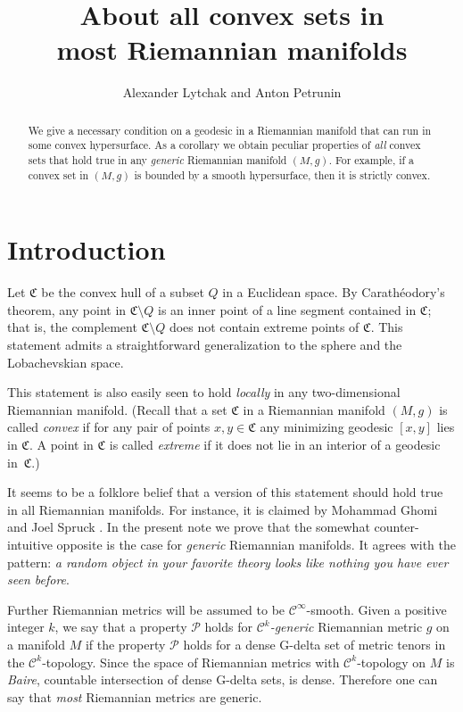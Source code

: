 \documentclass[a4paper,10pt]{article}
\def\thetitle{About all convex sets in\\ most Riemannian manifolds}
\begin{document}
\title{\thetitle}
\author{Alexander Lytchak and Anton Petrunin}
\date{}
\maketitle

\begin{abstract}
We give a necessary condition on a geodesic in a Riemannian manifold that can run in some convex hypersurface.
As a corollary we obtain peculiar properties of \emph{all} convex sets that hold true in any \emph{generic} Riemannian manifold $(M,g)$.
For example, if a convex set in $(M,g)$ is bounded by a smooth hypersurface, then it is strictly convex.
\end{abstract}

\section{Introduction}
Let $\mathfrak{C}$ be the convex hull of a subset $Q$ in a Euclidean space.
By Carathéodory's theorem, any point in $\mathfrak{C}\setminus Q$ is an inner point of a line segment contained in $\mathfrak{C}$;
that is, the complement $\mathfrak{C} \setminus Q$ does not contain extreme points of $\mathfrak{C}$.
This statement admits a straightforward generalization to the sphere and the Lobachevskian space.

This statement is also easily seen to hold \emph{locally} in any two-dimensional Riemannian manifold.
(Recall that a set $\mathfrak{C}$ in a Riemannian manifold $(M,g)$ is called \emph{convex} if for any pair of points $x,y\in \mathfrak{C}$ any minimizing geodesic $[x,y]$ lies in $\mathfrak{C}$.
A point in $\mathfrak{C}$ is called \emph{extreme} if it does not lie in an interior of a geodesic in~$\mathfrak{C}$.)

It seems to be a folklore belief that a version of this statement should hold true in all Riemannian manifolds.
For instance, it is claimed by Mohammad Ghomi and Joel Spruck \cite[Lemma 9.1]{Ghomi}.
In the present note we prove that the somewhat counter-intuitive opposite is the case for \emph{generic} Riemannian manifolds.
It agrees with the pattern: \emph{a random object in your favorite theory  looks like nothing you have ever seen before}.

Further Riemannian metrics will be assumed to be $\mathcal C^\infty$-smooth.
Given a positive integer $k$, we say that a property $\mathcal P$ holds for \emph{$\mathcal C^k$-generic} Riemannian metric $g$ on a manifold $M$ 
if the property $\mathcal P$ holds for a dense G-delta set of metric tenors in the $\mathcal C^k$-topology.
Since the space of Riemannian metrics with $\mathcal C^k$-topology on $M$ is \emph{Baire}, 
countable intersection of dense G-delta sets, is dense.
Therefore one can say that \emph{most} Riemannian metrics are generic.
\end{document}
